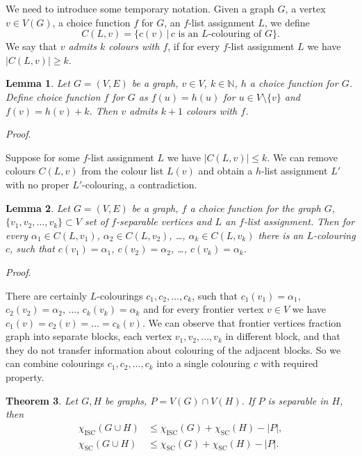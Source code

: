 \documentclass[11pt,a4paper]{article}
\theoremstyle{plain}
\newtheorem{thm}{Theorem}[section]
\newtheorem{lem}[thm]{Lemma}
\newenvironment{pf}{
  \par\medskip\noindent
  \textit{Proof}.
}{
\newline
\rightline{$\square$}  %
}
\theoremstyle{definition}
\theoremstyle{remark}
\newcommand{\scn}{\chi_\text{SC}}
\newcommand{\iscn}{\chi_\text{ISC}}
\begin{document}
We need to introduce some temporary notation. Given a graph $G$, a vertex $v\in V(G)$, a choice function $f$ for $G$, an $f$-list assignment $L$, we define
$$ C(L, v) = \{c(v)\,|\, c \text{ is an } L\text{-colouring of } G\}.$$
We say that \emph{$v$ admits $k$ colours with $f$}, if for every $f$-list assignment $L$ we have $|C(L, v)| \geq k$.

\begin{lem}\label{lem:barvy1}
Let $G=(V,E)$ be a graph, $v \in V$, $k\in \mathbb{N}$, $h$ a choice function for $G$. Define choice function $f$ for $G$ as $f(u)=h(u)$ for $u\in V\setminus \{v\}$ and $f(v)=h(v)+k$. Then $v$ admits $k+1$ colours with $f$.
\end{lem} 

\begin{pf}
Suppose for some $f$-list assignment $L$ we have $|C(L,v)|\leq k$. We can remove colours $C(L,v)$ from the colour list $L(v)$ and obtain a $h$-list assignment $L'$ with no proper $L'$-colouring, a contradiction.
\end{pf}

\begin{lem}\label{lem:barvy2}
Let $G=(V,E)$ be a graph, $f$ a choice function for the graph $G$, $\{v_1, v_2, \ldots, v_k\}\subset V$ set of $f$-separable vertices and $L$ an $f$-list assignment. Then for every $\alpha_1 \in C(L,v_1)$, $\alpha_2 \in C(L,v_2)$, \ldots, $\alpha_k \in C(L,v_k)$ there is an $L$-colouring $c$, such that $c(v_1)=\alpha_1$, $c(v_2)=\alpha_2$, \ldots, $c(v_k)=\alpha_k$.
\end{lem} 

\begin{pf}
There are certainly $L$-colourings $c_1, c_2, \ldots, c_k$, such that $c_1(v_1)=\alpha_1$, $c_2(v_2)=\alpha_2$, $\ldots$, $c_k(v_k)=\alpha_k$ and for every frontier vertex $v\in V$ we have $c_1(v)=c_2(v)=\ldots=c_k(v)$. We can observe that frontier vertices fraction graph into separate blocks, each vertex $v_1,v_2, \ldots, v_k$ in different block, and that they do not transfer information about colouring of the adjacent blocks. So we can combine colourings $c_1, c_2, \ldots, c_k$ into a single colouring $c$ with required property.
\end{pf}



\begin{thm}\label{thm:joins}
Let $G,H$ be graphs, $P = V(G)\cap V(H)$. If $P$ is separable in $H$, then
\begin{align*}
\iscn(G \cup H) &\leq \iscn(G) + \scn(H) - |P|, \\
\scn(G \cup H) &\leq \scn(G) + \scn(H) - |P|.
\end{align*}
\end{thm}
\end{document}
